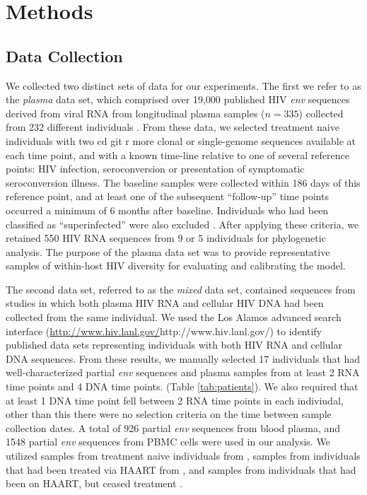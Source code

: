 \documentclass[12pt]{article}
\begin{document}

\section * {Methods} \label{sec:methods}



\subsection * {Data Collection} \label{subsec:dcollection}
We collected two distinct sets of data for our experiments. 
The first we refer to as the {\em plasma} data set, which comprised over 19,000 published HIV \textit{env} sequences derived from viral RNA from longitudinal plasma samples ($n=335$) collected from 232 different individuals \citep{McCloskey14}. 
From these data, we selected treatment naive individuals with two cd git
r more clonal or single-genome sequences available at each time point, and with a known time-line relative to one of several reference points: HIV infection, seroconversion or presentation of symptomatic seroconversion illness. 
The baseline samples were collected within 186 days of this reference point, and at least one of the subsequent ``follow-up'' time points occurred a minimum of 6 months after baseline.
Individuals who had been classified as ``superinfected'' were also excluded \citep{McCloskey14}.
After applying these criteria, we retained 550 HIV RNA sequences from 9 or 5 individuals for phylogenetic analysis.
The purpose of the plasma data set was to provide representative samples of within-host HIV diversity for evaluating and calibrating the model.

The second data set, referred to as the {\em mixed} data set, contained sequences from studies in which both plasma HIV RNA and cellular HIV DNA had been collected from the same individual.
We used the Los Alamos advanced search interface (\url{http://www.hiv.lanl.gov/}{http://www.hiv.lanl.gov/}) to identify published data sets representing individuals with both HIV RNA and cellular DNA sequences.
From these results, we manually selected 17 individuals that had well-characterized partial {\em env} sequences and plasma samples from at least 2 RNA time points and 4 DNA time points. (Table \ref{tab:patients}). 
We also required that at least 1 DNA time point fell between 2 RNA time points in each indiviudal, other than this there were no selection criteria on the time between sample collection dates. 
A total of 926 partial {\em env} sequences from blood plasma, and 1548 partial {\em env} sequences from PBMC cells were used in our analysis. 
We utilized samples from treatment naive individuals from \cite{Shankarappa99, Novitsky09}, samples from individuals that had been treated via HAART from \cite{Llewellyn06}, and samples from individuals that had been on HAART, but ceased treatment \cite{Fischer04}. 
 
\end{document}
